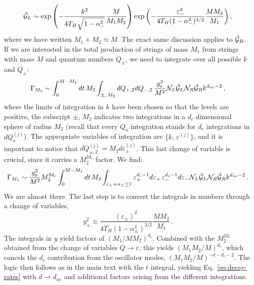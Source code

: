 \documentclass[a4paper,11pt]{article}
\newcommand{\lr}[1]{\left(#1\right)}
\begin{document}
\begin{equation}
    \Tilde{\mathcal{G}}_L\sim \exp{\lr{-\frac{k^2}{4 T_H\sqrt{1-\alpha_{-}^2}}\frac{M}{M_1M_2}}}\exp{\lr{-\frac{\varepsilon_{-}^2}{4T_H(1-\alpha^2_{-})^{3/2}}\frac{M M_2}{M_1}}}\, ,
\end{equation}
where we have written $M_1+M_2\simeq M$.
The exact same discussion applies to $\Tilde{\mathcal{G}}_R$.
If we are interested in the total production of strings of mass $M_1$ from strings with mass $M$ and quantum numbers $Q_{\pm}$, we need to integrate over all possible $k$ and $Q_{\pm}$:
\begin{equation}
    \Gamma_{M_1}\sim  \int_0^{M-M_1}{dt\, M_2  
\int_{\pm ,\, M_2}{dQ_{+,2}dQ_{-,2}\,  \frac{g_s^2}{M^2}\mathcal{N}_L\Tilde{\mathcal{G}}_L\mathcal{N}_R\Tilde{\mathcal{G}}_R k^{d_{nc}-2}}}\, ,
\end{equation}
where the limits of integration in $k$ have been chosen so that the levels are positive, the subscript $\pm , \, M_2$ indicates two integrations in a $d_c$ dimensional sphere of radius $M_2$ (recall that every $Q_a$ integration stands for $d_c$ integrations in $dQ_a^{(j)}$).
The appropriate variables of integration are $\lbrace k, \,  \varepsilon^{(j)}\rbrace$, and it is important to notice that $dQ_{\pm,2}^{(j)}=M_2d\varepsilon_\pm^{(j)}$.
This last change of variable is crucial, since it carries a $M_2^{2d_c}$ factor.
We find:
\begin{equation}
    \Gamma_{M_1}\sim \frac{g_s^2}{M^2}M_2^{2d_c}\int_0^{M-M_1}{dt\, M_2 \int_{\varepsilon_\pm+\alpha_\pm \leq 1}{\varepsilon_+^{d_c-1}d\varepsilon_{+}\, \varepsilon_{-}^{d_c-1}d\varepsilon_{-}\mathcal{N}_L\Tilde{\mathcal{G}}_L\mathcal{N}_R\Tilde{\mathcal{G}}_R k^{d_{nc} -2}}}\, .
\end{equation}
We are almost there. 
The last step is to convert the integrals in numbers through a change of variables, 
\begin{equation}
        y_\pm^2\equiv \frac{\lr{\varepsilon_{\pm}}^2}{4T_H(1-\alpha^2_{\pm})^{3/2}}\frac{M M_2}{M_1}\, .
\end{equation}
The integrals in $y$ yield factors of $\lr{M_1/M M_2}^{d_c}$.
Combined with the $M_2^{2d_c}$ obtained from the change of variables $Q\to \varepsilon$, this yields $\lr{M_1M_2/M}^{d_c}$, which cancels the $d_c$ contribution from the oscillator modes, $\lr{M_1M_2/M}^{-d-d_c-2}$.
The logic then follows as in the main text with the $t$ integral, yielding Eq.~\eqref{eq:decay-rates} with $d\to d_{nc}$ and additional factors arising from the different integrations.
\end{document}
